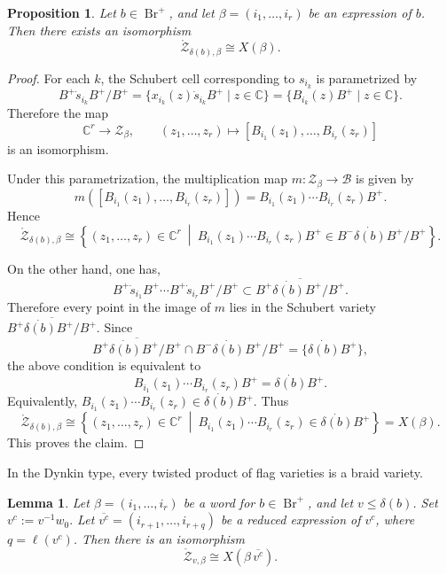 \documentclass[12pt, reqno]{amsart}
\theoremstyle{plain}
\newtheorem{proposition}[theorem]{Proposition}
\newtheorem{lemma}[theorem]{Lemma}
\theoremstyle{definition}
\numberwithin{equation}{section}
\newcommand{\Br}{{\operatorname{Br}}}
\begin{document}
\begin{proposition}\label{pro:braid}
Let \(b\in \Br^+\), and let \(\beta=(i_1,\dots,i_r)\) be an expression of \(b\).
Then there exists an isomorphism
\[
\mathring{\mathcal{Z}}_{\delta(b),\beta}\cong X(\beta).
\]
\end{proposition}

\begin{proof}
For each \(k\), the Schubert cell corresponding to \(s_{i_k}\) is parametrized by
\[
B^+\dot{s}_{i_k}B^+/B^+
=
\{x_{i_k}(z)\dot{s}_{i_k}B^+\mid z\in\mathbb C\}
=
\{B_{i_k}(z)B^+\mid z\in\mathbb C\}.
\]
Therefore the map
\[
\mathbb C^r\longrightarrow \mathcal Z_\beta,
\qquad
(z_1,\dots,z_r)
\longmapsto
[B_{i_1}(z_1),\dots,B_{i_r}(z_r)]
\]
is an isomorphism.

Under this parametrization, the multiplication map
\(
m:\mathcal Z_\beta\to \mathcal B
\)
is given by
\[
m([B_{i_1}(z_1),\dots,B_{i_r}(z_r)])
=
B_{i_1}(z_1)\cdots B_{i_r}(z_r)B^+.
\]
Hence
\[
\mathring{\mathcal Z}_{\delta(b),\beta}
\cong
\left\{
(z_1,\dots,z_r)\in\mathbb C^r
\ \middle|\
B_{i_1}(z_1)\cdots B_{i_r}(z_r)B^+
\in
B^-\dot{\delta(b)}B^+/B^+
\right\}.
\]

On the other hand, one has,
\[
B^+\dot{s}_{i_1}B^+\cdots B^+\dot{s}_{i_r}B^+/B^+
\subset
\overline{B^+\dot{\delta(b)}B^+/B^+}.
\]
Therefore every point in the image of \(m\) lies in the Schubert variety
\(
\overline{B^+\dot{\delta(b)}B^+/B^+}.
\)
Since
\[
\overline{B^+\dot{\delta(b)}B^+/B^+}
\cap
B^-\dot{\delta(b)}B^+/B^+
=
\{\dot{\delta(b)}B^+\},
\]
the above condition is equivalent to
\[
B_{i_1}(z_1)\cdots B_{i_r}(z_r)B^+
=
\dot{\delta(b)}B^+.
\]
Equivalently,
\(
B_{i_1}(z_1)\cdots B_{i_r}(z_r)
\in
\dot{\delta(b)}B^+.
\)
Thus
\[
\mathring{\mathcal Z}_{\delta(b),\beta}
\cong
\left\{
(z_1,\dots,z_r)\in\mathbb C^r
\ \middle|\
B_{i_1}(z_1)\cdots B_{i_r}(z_r)
\in
\dot{\delta(b)}B^+
\right\}
=
X(\beta).
\]
This proves the claim.
\end{proof}
In the Dynkin type, every twisted product of flag varieties is a braid variety.

\begin{lemma}\label{lem:isoZvbeta}
Let \(\beta=(i_1,\dots,i_r)\) be a word for \(b\in \Br^+\), and let
\(v\leq \delta(b)\). Set
\(
v^c:=v^{-1}w_0.
\)
Let
\(
\overline{v^c}=(i_{r+1},\dots,i_{r+q})
\)
be a reduced expression of \(v^c\), where \(q=\ell(v^c)\). Then there is an
isomorphism
\[
\mathring{\mathcal{Z}}_{v,\beta}\cong X(\beta\,\overline{v^c}).
\]
\end{lemma}
\end{document}
